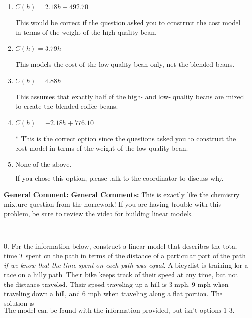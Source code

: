 \documentclass{extbook}[14pt]
\begin{document}
\begin{enumerate}[label=\Alph*.] 
\item $ C(h) = 2.18 h + 492.70 $ 

 This would be correct if the question asked you to construct the cost model in terms of the weight of the high-quality bean. 
\item $ C(h) = 3.79 h $ 

 This models the cost of the low-quality bean only, not the blended beans. 
\item $ C(h) = 4.88 h $ 

 This assumes that exactly half of the high- and low- quality beans are mixed to create the blended coffee beans. 
\item $ C(h) = -2.18 h + 776.10 $ 

 * This is the correct option since the questions asked you to construct the cost model in terms of the weight of the low-quality bean. 
\item $ \text{None of the above.} $ 

 If you chose this option, please talk to the coordinator to discuss why. 
\end{enumerate} 
 
\textbf{General Comment:} \textbf{General Comments:} This is exactly like the chemistry mixture question from the homework! If you are having trouble with this problem, be sure to review the video for building linear models. 

-----------------------------------------------

0. For the information below, construct a linear model that describes the total time $T$ spent on the path in terms of the distance of a particular part of the path \textit{if we know that the time spent on each path was equal}.
A bicyclist is training for a race on a hilly path. Their bike keeps track of their speed at any time, but not the distance traveled. Their speed traveling up a hill is 3 mph, 9 mph when traveling down a hill, and 6 mph when traveling along a flat portion. 
The solution is $ \text{The model can be found with the information provided, but isn't options 1-3.} $ 
\end{document}
